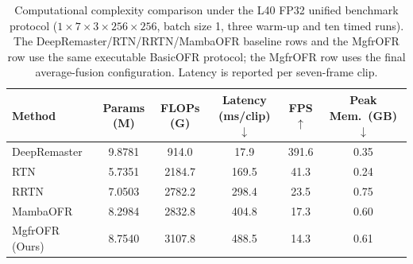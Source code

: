 \documentclass[symmetry,article,submit,pdftex,moreauthors]{Definitions/mdpi}
\providecommand{\DIFaddbegin}{} %
\providecommand{\DIFaddend}{} %
\providecommand{\DIFdelbegin}{} %
\providecommand{\DIFdelend}{} %
\begin{document}
\DIFdelbegin %
\DIFdelend \DIFaddbegin \begin{table}[htbp]
\caption{Computational complexity comparison under the L40 FP32 unified benchmark protocol ($1{\times}7{\times}3{\times}256{\times}256$, batch size 1, three warm-up and ten timed runs). The DeepRemaster/RTN/RRTN/MambaOFR baseline rows and the MgfrOFR row use the same executable BasicOFR protocol; the MgfrOFR row uses the final average-fusion configuration. Latency is reported per seven-frame clip.\label{tab:complexity}}
\begin{tabularx}{\textwidth}{lCCCCC}
\toprule
\textbf{Method} & \textbf{Params (M)} & \textbf{FLOPs (G)} & \textbf{Latency (ms/clip)$\downarrow$} & \textbf{FPS$\uparrow$} & \textbf{Peak Mem.\ (GB)$\downarrow$} \\
\midrule
DeepRemaster~\cite{iizuka2019deepremaster}   & 9.8781 & 914.0  & 17.9  & 391.6 & 0.35 \\
RTN~\cite{wan2022rtn}                        & 5.7351 & 2184.7 & 169.5 & 41.3  & 0.24 \\
RRTN~\cite{lin2024rrtn}                      & 7.0503 & 2782.2 & 298.4 & 23.5  & 0.75 \\
MambaOFR~\cite{mao2025mambaofr}              & 8.2984 & 2832.8 & 404.8 & 17.3  & 0.60 \\
\midrule
MgfrOFR (Ours)                              & 8.7540 & 3107.8 & 488.5 & 14.3  & 0.61 \\
\bottomrule
\end{tabularx}
\end{table}
\DIFaddend 
\end{document}
